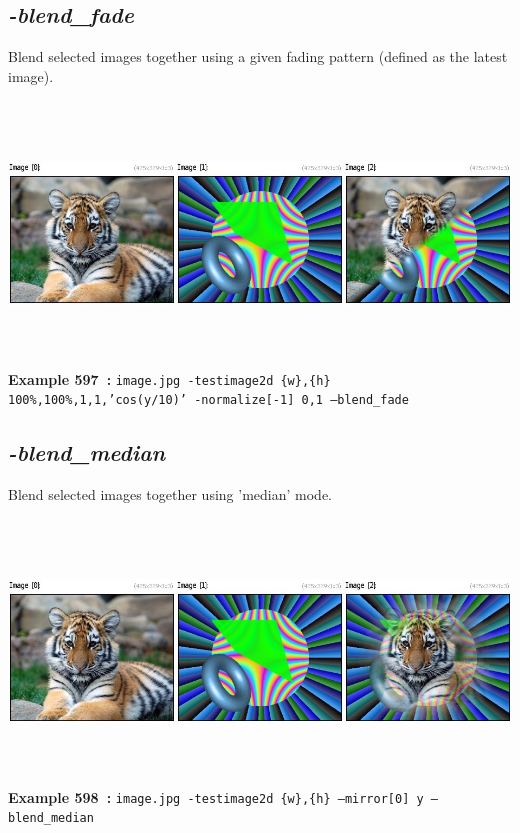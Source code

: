 \documentclass[a4paper,11pt,twoside]{book}
\begin{document}
\subsection{\emph{-blend\_fade} }\vspace*{-0.5em}
Blend selected images together using a given fading pattern (defined as the latest image).
\begin{center}\includegraphics[keepaspectratio=true,height=7cm,width=\textwidth]{img/gmic_def597.jpg}\\
{\footnotesize \textbf{Example 597~:} \texttt{image.jpg -testimage2d \{w\},\{h\} 100\%,100\%,1,1,'cos(y/10)' -normalize[-1] 0,1 --blend\_fade}}
\end{center}

\subsection{\emph{-blend\_median} }\vspace*{-0.5em}
Blend selected images together using 'median' mode.
\begin{center}\includegraphics[keepaspectratio=true,height=7cm,width=\textwidth]{img/gmic_def598.jpg}\\
{\footnotesize \textbf{Example 598~:} \texttt{image.jpg -testimage2d \{w\},\{h\} --mirror[0] y --blend\_median}}
\end{center}
\end{document}
